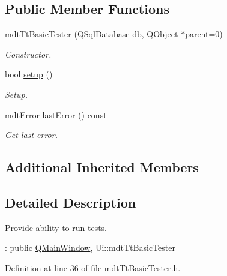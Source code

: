 \subsection*{Public Member Functions}
\begin{DoxyCompactItemize}
\item 
\hyperlink{classmdt_tt_basic_tester_a180ae78c3a887bb86acbb29ec42d3128}{mdt\-Tt\-Basic\-Tester} (\hyperlink{class_q_sql_database}{Q\-Sql\-Database} db, Q\-Object $\ast$parent=0)
\begin{DoxyCompactList}\small\item\em Constructor. \end{DoxyCompactList}\item 
bool \hyperlink{classmdt_tt_basic_tester_ac831c6c6204439936c8f344f615bc50a}{setup} ()
\begin{DoxyCompactList}\small\item\em Setup. \end{DoxyCompactList}\item 
\hyperlink{classmdt_error}{mdt\-Error} \hyperlink{classmdt_tt_basic_tester_a56c25aca166611fe7a2f72e9c150c40c}{last\-Error} () const 
\begin{DoxyCompactList}\small\item\em Get last error. \end{DoxyCompactList}\end{DoxyCompactItemize}
\subsection*{Additional Inherited Members}


\subsection{Detailed Description}
Provide ability to run tests. 

\-: public \hyperlink{class_q_main_window}{Q\-Main\-Window}, Ui\-::mdt\-Tt\-Basic\-Tester 

Definition at line 36 of file mdt\-Tt\-Basic\-Tester.\-h.



